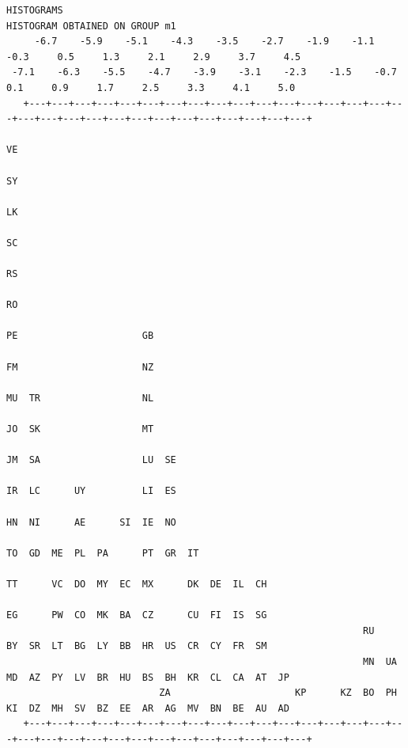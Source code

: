 \documentclass[a4paper,10pt,twocolumn]{article}
\begin{document}
\begin{landscape}
\begin{verbatim}
HISTOGRAMS
HISTOGRAM OBTAINED ON GROUP m1
     -6.7    -5.9    -5.1    -4.3    -3.5    -2.7    -1.9    -1.1    -0.3     0.5     1.3     2.1     2.9     3.7     4.5
 -7.1    -6.3    -5.5    -4.7    -3.9    -3.1    -2.3    -1.5    -0.7     0.1     0.9     1.7     2.5     3.3     4.1     5.0
   +---+---+---+---+---+---+---+---+---+---+---+---+---+---+---+---+---+---+---+---+---+---+---+---+---+---+---+---+---+---+
                                                                                       VE
                                                                                       SY
                                                                                       LK
                                                                                       SC
                                                                                       RS
                                                                                       RO
                                                                                       PE                      GB
                                                                                       FM                      NZ
                                                                                       MU  TR                  NL
                                                                                       JO  SK                  MT
                                                                                       JM  SA                  LU  SE
                                                                                       IR  LC      UY          LI  ES
                                                                                       HN  NI      AE      SI  IE  NO
                                                                                   TO  GD  ME  PL  PA      PT  GR  IT
                                                                           TT      VC  DO  MY  EC  MX      DK  DE  IL  CH
                                                                           EG      PW  CO  MK  BA  CZ      CU  FI  IS  SG
                                                               RU          BY  SR  LT  BG  LY  BB  HR  US  CR  CY  FR  SM
                                                               MN  UA  MD  AZ  PY  LV  BR  HU  BS  BH  KR  CL  CA  AT  JP
                           ZA                      KP      KZ  BO  PH  KI  DZ  MH  SV  BZ  EE  AR  AG  MV  BN  BE  AU  AD
   +---+---+---+---+---+---+---+---+---+---+---+---+---+---+---+---+---+---+---+---+---+---+---+---+---+---+---+---+---+---+

\end{verbatim}
\end{landscape}
\end{document}

